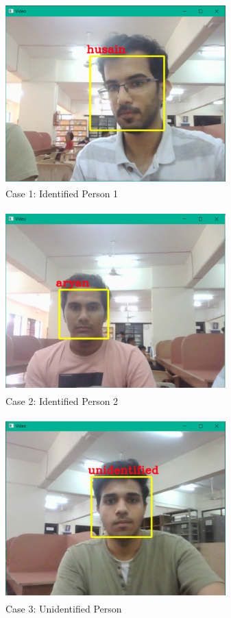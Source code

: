 \documentclass[conference]{IEEEtran}
\begin{document}
	\begin{figure}
		\centering
		\includegraphics[width=8.5cm, height=7cm]{Husain.png}
		\caption{\label{fig:The-caption}Case 1: Identified Person 1}
	\end{figure}
	\begin{figure}
		\centering
		\includegraphics[width=8.5cm, height=7cm]{Aryan.png}
		\caption{\label{fig:The-caption}Case 2: Identified Person 2}
	\end{figure}
	\begin{figure}
		\centering
		\includegraphics[width=8.5cm, height=7cm]{Un.png}
		\caption{\label{fig:The-caption}Case 3: Unidentified Person}
	\end{figure}
\end{document}
